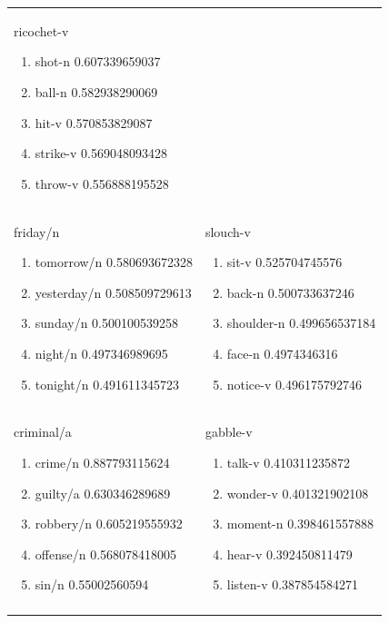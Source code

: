 \documentclass[12pt]{article}
\begin{document}
\begin{longtable}{ p{7cm} | p{7cm} }
		ricochet-v
		\begin{enumerate}
			\item shot-n 0.607339659037
			\item ball-n 0.582938290069
			\item hit-v 0.570853829087
			\item strike-v 0.569048093428
			\item throw-v 0.556888195528
		\end{enumerate}
		\\
		friday/n
		\begin{enumerate}
			\item tomorrow/n 0.580693672328
			\item yesterday/n 0.508509729613
			\item sunday/n 0.500100539258
			\item night/n 0.497346989695
			\item tonight/n 0.491611345723
		\end{enumerate} &
		slouch-v
		\begin{enumerate}
			\item sit-v 0.525704745576
			\item back-n 0.500733637246
			\item shoulder-n 0.499656537184
			\item face-n 0.4974346316
			\item notice-v 0.496175792746
		\end{enumerate}
		\\
		criminal/a
		\begin{enumerate}
			\item crime/n 0.887793115624
			\item guilty/a 0.630346289689
			\item robbery/n 0.605219555932
			\item offense/n 0.568078418005
			\item sin/n 0.55002560594
		\end{enumerate} &
		gabble-v
		\begin{enumerate}
			\item talk-v 0.410311235872
			\item wonder-v 0.401321902108
			\item moment-n 0.398461557888
			\item hear-v 0.392450811479
			\item listen-v 0.387854584271
		\end{enumerate}
		\\
		&
		
		\\
	\end{longtable}
\end{document}
